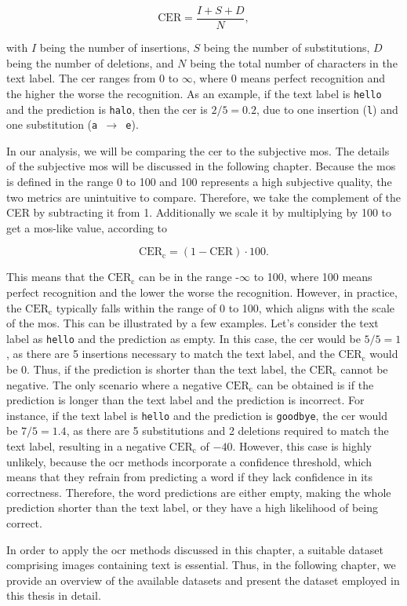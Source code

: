 \begin{equation}
    \text{CER} = \frac{I + S + D}{N},
    \label{eq:cer}
\end{equation}

with $I$ being the number of insertions, $S$ being the number of substitutions, $D$ being the number of deletions, and $N$ being the total number of characters in the text label.
The \gls{cer} ranges from 0 to $\infty$, where 0 means perfect recognition and the higher the worse the recognition.
As an example, if the text label is \texttt{hello} and the prediction is \texttt{halo}, then the \gls{cer} is $2/5 = 0.2$, due to one insertion (\texttt{l}) and one substitution (\texttt{a $\rightarrow$ e}).

In our analysis, we will be comparing the \gls{cer} to the subjective \gls{mos}.
The details of the subjective \gls{mos} will be discussed in the following chapter.
Because the \gls{mos} is defined in the range 0 to 100 and 100 represents a high subjective quality, the two metrics are unintuitive to compare.
Therefore, we take the complement of the CER by subtracting it from 1.
Additionally we scale it by multiplying by 100 to get a \gls{mos}-like value, according to

\begin{equation}
    \text{CER}_{\text{c}} = (1 - \text{CER}) \cdot 100.
    \label{eq:cer2mos}
\end{equation}

This means that the $\text{CER}_{\text{c}}$ can be in the range -$\infty$ to 100, where 100 means perfect recognition and the lower the worse the recognition.
However, in practice, the $\text{CER}_{\text{c}}$ typically falls within the range of 0 to 100, which aligns with the scale of the \gls{mos}.
This can be illustrated by a few examples.
Let's consider the text label as \texttt{hello} and the prediction as empty.
In this case, the \gls{cer} would be $5/5 = 1$, as there are 5 insertions necessary to match the text label, and the $\text{CER}_{\text{c}}$ would be $0$.
Thus, if the prediction is shorter than the text label, the $\text{CER}_{\text{c}}$ cannot be negative.
The only scenario where a negative $\text{CER}_{\text{c}}$ can be obtained is if the prediction is longer than the text label and the prediction is incorrect.
For instance, if the text label is \texttt{hello} and the prediction is \texttt{goodbye}, the \gls{cer} would be $7/5 = 1.4$, as there are 5 substitutions and 2 deletions required to match the text label, resulting in a negative $\text{CER}_{\text{c}}$ of $-40$.
However, this case is highly unlikely, because the \gls{ocr} methods incorporate a confidence threshold, which means that they refrain from predicting a word if they lack confidence in its correctness.
Therefore, the word predictions are either empty, making the whole prediction shorter than the text label, or they have a high likelihood of being correct.

In order to apply the \gls{ocr} methods discussed in this chapter, a suitable dataset comprising images containing text is essential.
Thus, in the following chapter, we provide an overview of the available datasets and present the dataset employed in this thesis in detail.
